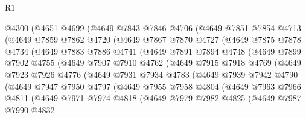 \begin{lexlean}{R1}
\begin{coremodule}
    @4300
      (@4651
        @4699
        (@4649
          @7843
          @7846
          @4706
          (@4649
            @7851
            @7854
            @4713
            (@4649
              @7859
              @7862
              @4720
              (@4649
                @7867
                @7870
                @4727
                (@4649
                  @7875
                  @7878
                  @4734
                  (@4649
                    @7883
                    @7886
                    @4741
                    (@4649
                      @7891
                      @7894
                      @4748
                      (@4649
                        @7899
                        @7902
                        @4755
                        (@4649
                          @7907
                          @7910
                          @4762
                          (@4649
                            @7915
                            @7918
                            @4769
                            (@4649
                              @7923
                              @7926
                              @4776
                              (@4649
                                @7931
                                @7934
                                @4783
                                (@4649
                                  @7939
                                  @7942
                                  @4790
                                  (@4649
                                    @7947
                                    @7950
                                    @4797
                                    (@4649
                                      @7955
                                      @7958
                                      @4804
                                      (@4649
                                        @7963
                                        @7966
                                        @4811
                                        (@4649
                                          @7971
                                          @7974
                                          @4818
                                          (@4649
                                            @7979
                                            @7982
                                            @4825
                                            (@4649
                                              @7987
                                              @7990
                                              @4832

\end{coremodule}
\end{lexlean}
